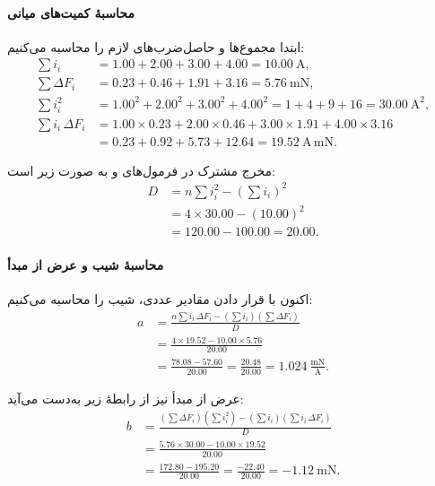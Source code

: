\documentclass[a4paper, 11pt]{article}
\begin{document}
\paragraph{محاسبهٔ کمیت‌های میانی}
ابتدا مجموع‌ها و حاصل‌ضرب‌های لازم را محاسبه می‌کنیم:
\begin{align}
\sum i_i &= 1.00 + 2.00 + 3.00 + 4.00 = 10.00~\mathrm{A}, \\
\sum \Delta F_i &= 0.23 + 0.46 + 1.91 + 3.16 = 5.76~\mathrm{mN}, \\
\sum i_i^2 &= 1.00^2 + 2.00^2 + 3.00^2 + 4.00^2 
           = 1 + 4 + 9 + 16 
           = 30.00~\mathrm{A}^2, \\
\sum i_i\,\Delta F_i &= 1.00\times 0.23 + 2.00\times 0.46 + 3.00\times 1.91 + 4.00\times 3.16 \nonumber\\
&= 0.23 + 0.92 + 5.73 + 12.64 
= 19.52~\mathrm{A\,mN}.
\end{align}

مخرج مشترک در فرمول‌های  و  به صورت زیر است:
\begin{align}
D &= n\sum i_i^2 - \left(\sum i_i\right)^2 \nonumber\\
  &= 4\times 30.00 - (10.00)^2 \nonumber\\
  &= 120.00 - 100.00 = 20.00.
\end{align}

\paragraph{محاسبهٔ شیب و عرض از مبدأ}
اکنون با قرار دادن مقادیر عددی، شیب  را محاسبه می‌کنیم:
\begin{align}
a &= \frac{n\sum i_i\,\Delta F_i - \left(\sum i_i\right)\left(\sum \Delta F_i\right)}
         {D} \nonumber\\
  &= \frac{4\times 19.52 - 10.00\times 5.76}{20.00} \nonumber\\
  &= \frac{78.08 - 57.60}{20.00} 
   = \frac{20.48}{20.00} 
   = 1.024~\frac{\mathrm{mN}}{\mathrm{A}}.
\end{align}

عرض از مبدأ  نیز از رابطهٔ زیر به‌دست می‌آید:
\begin{align}
b &= \frac{\left(\sum \Delta F_i\right)\left(\sum i_i^2\right) - \left(\sum i_i\right)\left(\sum i_i\,\Delta F_i\right)}
         {D} \nonumber\\
  &= \frac{5.76\times 30.00 - 10.00\times 19.52}{20.00} \nonumber\\
  &= \frac{172.80 - 195.20}{20.00} 
   = \frac{-22.40}{20.00} 
   = -1.12~\mathrm{mN}.
\end{align}
\end{document}
